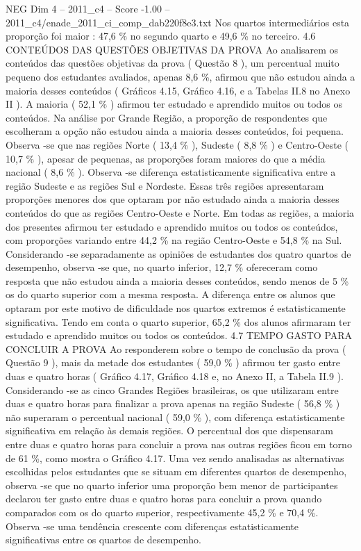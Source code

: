 \begin{textsample}{NEG Dim 4 – 2011\_c4 – Score -1.00 – 2011\_c4/enade\_2011\_ci\_comp\_dab220f8e3.txt}
Nos quartos intermediários esta proporção foi maior : 47,6 \% no segundo quarto e 49,6 \% no terceiro. 4.6 CONTEÚDOS DAS QUESTÕES OBJETIVAS DA PROVA Ao analisarem os conteúdos das questões objetivas da prova ( Questão 8 ), um percentual muito pequeno dos estudantes avaliados, apenas 8,6 \%, afirmou que não estudou ainda a maioria desses conteúdos ( Gráficos 4.15, Gráfico 4.16, e a Tabelas II.8 no Anexo II ).
A maioria ( 52,1 \% ) afirmou ter estudado e aprendido muitos ou todos os conteúdos.
Na análise por Grande Região, a proporção de respondentes que escolheram a opção não estudou ainda a maioria desses conteúdos, foi pequena.
Observa -se que nas regiões Norte ( 13,4 \% ), Sudeste ( 8,8 \% ) e Centro-Oeste ( 10,7 \% ), apesar de pequenas, as proporções foram maiores do que a média nacional ( 8,6 \% ).
Observa -se diferença estatisticamente significativa entre a região Sudeste e as regiões Sul e Nordeste.
Essas três regiões apresentaram proporções menores dos que optaram por não estudado ainda a maioria desses conteúdos do que as regiões Centro-Oeste e Norte.
Em todas as regiões, a maioria dos presentes afirmou ter estudado e aprendido muitos ou todos os conteúdos, com proporções variando entre 44,2 \% na região Centro-Oeste e 54,8 \% na Sul.
Considerando -se separadamente as opiniões de estudantes dos quatro quartos de desempenho, observa -se que, no quarto inferior, 12,7 \% ofereceram como resposta que não estudou ainda a maioria desses conteúdos, sendo menos de 5 \% os do quarto superior com a mesma resposta.
A diferença entre os alunos que optaram por este motivo de dificuldade nos quartos extremos é estatisticamente significativa.
Tendo em conta o quarto superior, 65,2 \% dos alunos afirmaram ter estudado e aprendido muitos ou todos os conteúdos. 4.7 TEMPO GASTO PARA CONCLUIR A PROVA Ao responderem sobre o tempo de conclusão da prova ( Questão 9 ), mais da metade dos estudantes ( 59,0 \% ) afirmou ter gasto entre duas e quatro horas ( Gráfico 4.17, Gráfico 4.18 e, no Anexo II, a Tabela II.9 ).
Considerando -se as cinco Grandes Regiões brasileiras, os que utilizaram entre duas e quatro horas para finalizar a prova apenas na região Sudeste ( 56,8 \% ) não superaram o percentual nacional ( 59,0 \% ), com diferença estatisticamente significativa em relação às demais regiões.
O percentual dos que dispensaram entre duas e quatro horas para concluir a prova nas outras regiões ficou em torno de 61 \%, como mostra o Gráfico 4.17.
Uma vez sendo analisadas as alternativas escolhidas pelos estudantes que se situam em diferentes quartos de desempenho, observa -se que no quarto inferior uma proporção bem menor de participantes declarou ter gasto entre duas e quatro horas para concluir a prova quando comparados com os do quarto superior, respectivamente 45,2 \% e 70,4 \%.
Observa -se uma tendência crescente com diferenças estatisticamente significativas entre os quartos de desempenho.

\end{textsample}
